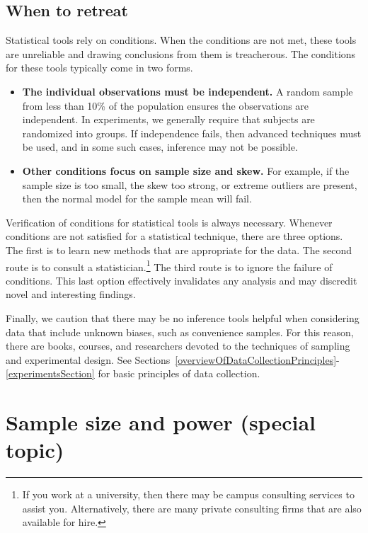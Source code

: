 \subsection{When to retreat}
\label{whenToRetreat}

Statistical tools rely on conditions. When the conditions are not met, these tools are unreliable and drawing conclusions from them is treacherous. The conditions for these tools typically come in two forms.
\begin{itemize}
\setlength{\itemsep}{0mm}
\item \textbf{The individual observations must be independent.} A random sample from less than 10\% of the population ensures the observations are independent. In experiments, we generally require that subjects are randomized into groups. If independence fails, then advanced techniques must be used, and in some such cases, inference may not be possible.
\item \textbf{Other conditions focus on sample size and skew.} For example, if the sample size is too small, the skew too strong, or extreme outliers are present, then the normal model for the sample mean will fail.
\end{itemize}
Verification of conditions for statistical tools is always necessary. Whenever conditions are not satisfied for a statistical technique, there are three options. The first is to learn new methods that are appropriate for the data. The second route is to consult a statistician.\footnote{If you work at a university, then there may be campus consulting services to assist you. Alternatively, there are many private consulting firms that are also available for hire.} The third route is to ignore the failure of conditions. This last option effectively invalidates any analysis and may discredit novel and interesting findings.

Finally, we caution that there may be no inference tools helpful when considering data that include unknown biases, such as convenience samples. For this reason, there are books, courses, and researchers devoted to the techniques of sampling and experimental design. See Sections~\ref{overviewOfDataCollectionPrinciples}-\ref{experimentsSection} for basic principles of data collection.



\section{Sample size and power (special topic)}
\label{sampleSizeAndPower}

